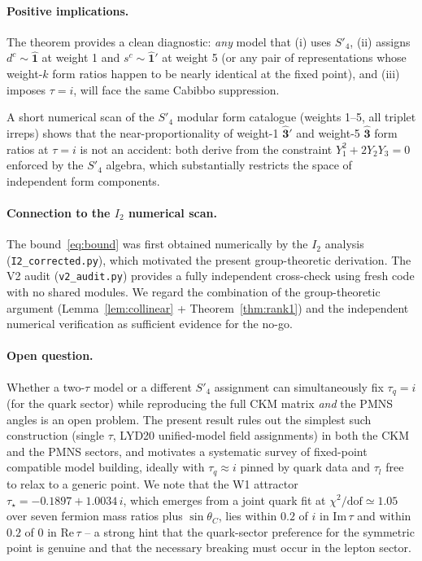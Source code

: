 \documentclass[a4paper,11pt]{article}
\newcommand{\Spf}{S'_4}
\begin{document}
\paragraph{Positive implications.}
The theorem provides a clean diagnostic: \emph{any} model that (i) uses
$\Spf$, (ii) assigns $d^c\sim\hat{\mathbf{1}}$ at weight 1 and
$s^c\sim\hat{\mathbf{1}}'$ at weight 5 (or any pair of representations
whose weight-$k$ form ratios happen to be nearly identical at the
fixed point), and (iii) imposes $\tau=i$, will face the same Cabibbo
suppression.

A short numerical scan of the $\Spf$ modular form catalogue
(weights 1--5, all triplet irreps) shows that the near-proportionality
of weight-1 $\hat{\mathbf{3}}'$ and weight-5 $\hat{\mathbf{3}}$ form
ratios at $\tau=i$ is not an accident: both derive from the constraint
$Y_1^2+2Y_2 Y_3=0$ enforced by the $\Spf$ algebra, which substantially
restricts the space of independent form components.

\paragraph{Connection to the $I_2$ numerical scan.}
The bound~\eqref{eq:bound} was first obtained numerically by the $I_2$
analysis (\texttt{I2\_corrected.py}), which motivated the present
group-theoretic derivation.  The V2 audit (\texttt{v2\_audit.py})
provides a fully independent cross-check using fresh code with no shared
modules.  We regard the combination of the group-theoretic argument
(Lemma~\ref{lem:collinear} + Theorem~\ref{thm:rank1}) and the
independent numerical verification as sufficient evidence for the
no-go.

\paragraph{Open question.}
Whether a two-$\tau$ model or a different $\Spf$ assignment can
simultaneously fix $\tau_q=i$ (for the quark sector) while reproducing
the full CKM matrix \emph{and} the PMNS angles is an open problem.
The present result rules out the simplest such construction (single
$\tau$, LYD20 unified-model field assignments) in both the CKM and the
PMNS sectors, and motivates a systematic survey of fixed-point
compatible model building, ideally with $\tau_q\approx i$ pinned by
quark data and $\tau_l$ free to relax to a generic point.  We note
that the W1 attractor $\tau_\star = -0.1897 + 1.0034\,i$, which
emerges from a joint quark fit at $\chi^2/\mathrm{dof}\simeq 1.05$
over seven fermion mass ratios plus $\sin\theta_C$, lies within
$0.2$ of $i$ in $\mathrm{Im}\,\tau$ and within $0.2$ of $0$ in
$\mathrm{Re}\,\tau$ -- a strong hint that the quark-sector preference
for the symmetric point is genuine and that the necessary breaking
must occur in the lepton sector.
\end{document}
